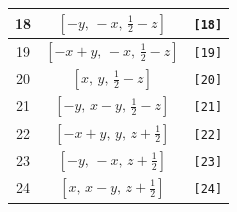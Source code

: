 \documentclass[fleqn,8pt]{jsarticle}
\begin{document}
\begin{longtable}{ccc}
18 & $\left[ - y,\, - x,\, \frac{1}{2} - z \right]$ & {\tt [18]} \\ \hline
19 & $\left[ - x + y,\, - x,\, \frac{1}{2} - z \right]$ & {\tt [19]} \\ \hline
20 & $\left[ x,\, y,\, \frac{1}{2} - z \right]$ & {\tt [20]} \\ \hline
21 & $\left[ - y,\, x - y,\, \frac{1}{2} - z \right]$ & {\tt [21]} \\ \hline
22 & $\left[ - x + y,\, y,\, z + \frac{1}{2} \right]$ & {\tt [22]} \\ \hline
23 & $\left[ - y,\, - x,\, z + \frac{1}{2} \right]$ & {\tt [23]} \\ \hline
24 & $\left[ x,\, x - y,\, z + \frac{1}{2} \right]$ & {\tt [24]} \\
\end{longtable}
\end{document}
